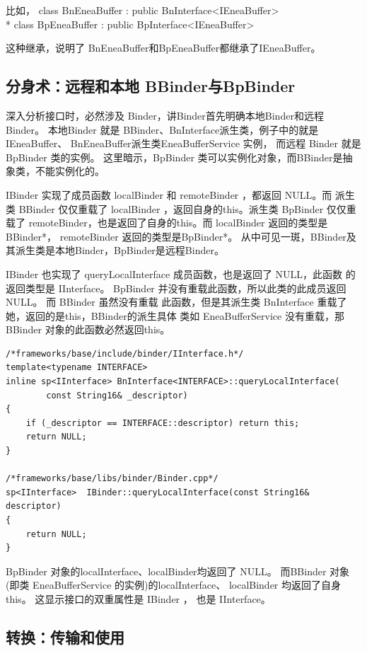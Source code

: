 \documentclass[a4paper,11pt]{article}
\begin{document}
比如，
class BnEneaBuffer : public BnInterface<IEneaBuffer> \\*
class BpEneaBuffer : public BpInterface<IEneaBuffer>

这种继承，说明了 BnEneaBuffer和BpEneaBuffer都继承了IEneaBuffer。

\subsection{分身术：远程和本地 BBinder与BpBinder}
深入分析接口时，必然涉及 Binder，讲Binder首先明确本地Binder和远程Binder。
本地Binder 就是 BBinder、BnInterface派生类，例子中的就是IEneaBuffer、
BnEneaBuffer派生类EneaBufferService 实例， 而远程 Binder 就是 BpBinder 类的实例。
这里暗示，BpBinder 类可以实例化对象，而BBinder是抽象类，不能实例化的。

IBinder\cite{BinderCpp} 实现了成员函数 localBinder 和 remoteBinder ，都返回 NULL。而
派生类 BBinder 仅仅重载了 localBinder ，返回自身的this。派生类 BpBinder 仅仅重载了
remoteBinder，也是返回了自身的this。而 localBinder 返回的类型是 BBinder*，  remoteBinder 返回的类型是BpBinder*。
 从中可见一斑，BBinder及其派生类是本地Binder，BpBinder是远程Binder。

IBinder 也实现了 queryLocalInterface 成员函数，也是返回了 NULL，此函数
的返回类型是 IInterface。 BpBinder 并没有重载此函数，所以此类的此成员返回NULL。 而 BBinder 虽然没有重载
此函数，但是其派生类 BnInterface 重载了她，返回的是this，BBinder的派生具体
类如 EneaBufferService 没有重载，那BBinder 对象的此函数必然返回this。
\begin{lstlisting}[caption=queryLocalInterface 的实现]
/*frameworks/base/include/binder/IInterface.h*/
template<typename INTERFACE>
inline sp<IInterface> BnInterface<INTERFACE>::queryLocalInterface(
        const String16& _descriptor)
{
    if (_descriptor == INTERFACE::descriptor) return this;
    return NULL;
}    

/*frameworks/base/libs/binder/Binder.cpp*/
sp<IInterface>  IBinder::queryLocalInterface(const String16& descriptor)
{
    return NULL;
} 
\end{lstlisting}

BpBinder 对象的localInterface、localBinder均返回了 NULL。
而BBinder 对象(即类 EneaBufferService 的实例)的localInterface、 localBinder 均返回了自身this。
这显示接口的双重属性是 IBinder ， 也是 IInterface。

\subsection{转换：传输和使用}
\end{document}
